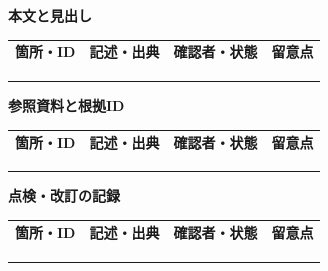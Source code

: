 \documentclass[11pt,a4paper]{article}
\begin{document}
\par{}\noindent\textbf{本文と見出し}\par\vspace{1mm}
{\fontsize{8.5}{13}\selectfont
\begin{tabularx}{\linewidth}{@{}XXXX@{}}
\textbf{箇所・ID} & \textbf{記述・出典} & \textbf{確認者・状態} & \textbf{留意点}\\[2mm]
\strut & \strut & \strut & \strut\\[5mm]
\strut & \strut & \strut & \strut\\[5mm]
\strut & \strut & \strut & \strut\\[5mm]
\end{tabularx}
}\vspace{2mm}\par
{}
\par{}\noindent\textbf{参照資料と根拠ID}\par\vspace{1mm}
{\fontsize{8.5}{13}\selectfont
\begin{tabularx}{\linewidth}{@{}XXXX@{}}
\textbf{箇所・ID} & \textbf{記述・出典} & \textbf{確認者・状態} & \textbf{留意点}\\[2mm]
\strut & \strut & \strut & \strut\\[5mm]
\strut & \strut & \strut & \strut\\[5mm]
\strut & \strut & \strut & \strut\\[5mm]
\end{tabularx}
}\vspace{2mm}\par
{}
\par{}\noindent\textbf{点検・改訂の記録}\par\vspace{1mm}
{\fontsize{8.5}{13}\selectfont
\begin{tabularx}{\linewidth}{@{}XXXX@{}}
\textbf{箇所・ID} & \textbf{記述・出典} & \textbf{確認者・状態} & \textbf{留意点}\\[2mm]
\strut & \strut & \strut & \strut\\[5mm]
\strut & \strut & \strut & \strut\\[5mm]
\strut & \strut & \strut & \strut\\[5mm]
\end{tabularx}
}\vspace{2mm}\par
\end{document}
